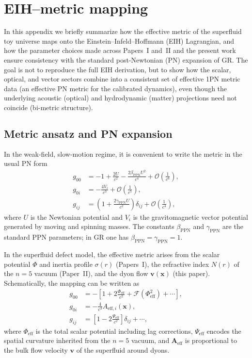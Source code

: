 \documentclass[11pt]{article}
\begin{document}
\section{EIH--metric mapping}
\label{app:eih-metric}

In this appendix we briefly summarize how the effective metric of the
superfluid toy universe maps onto the Einstein--Infeld--Hoffmann
(EIH) Lagrangian, and how the parameter choices made across
Papers~I and~II and the present work ensure consistency with the standard post-Newtonian
(PN) expansion of GR.
The goal is not to reproduce the full EIH derivation, but to show how
the scalar, optical, and vector sectors combine into a consistent set of
effective 1PN metric data (an effective PN metric for the calibrated dynamics),
even though the underlying acoustic (optical) and hydrodynamic (matter)
projections need not coincide (bi-metric structure).

\subsection{Metric ansatz and PN expansion}

In the weak-field, slow-motion regime, it is convenient to write the
metric in the usual PN form
\begin{align}
g_{00}
  &= -1 + \frac{2U}{c^2} - \frac{2\beta_{\mathrm{PPN}} U^2}{c^4}
     + \mathcal{O}\!\left(\frac{1}{c^6}\right),
  \label{eq:app-g00-PN}\\
  g_{0i}
  &= -\frac{4V_i}{c^3}
     + \mathcal{O}\!\left(\frac{1}{c^5}\right),
  \label{eq:app-g0i-PN}\\
g_{ij}
  &= \left(1 + \frac{2\gamma_{\mathrm{PPN}} U}{c^2}\right)\delta_{ij}
     + \mathcal{O}\!\left(\frac{1}{c^4}\right),
  \label{eq:app-gij-PN}
\end{align}
where $U$ is the Newtonian potential and $V_i$ is the gravitomagnetic
vector potential generated by moving and spinning masses.
The constants $\beta_{\mathrm{PPN}}$ and $\gamma_{\mathrm{PPN}}$ are
the standard PPN parameters;
in GR one has $\beta_{\mathrm{PPN}}=\gamma_{\mathrm{PPN}}=1$.

In the superfluid defect model, the effective metric arises from the
scalar potential $\Phi$ and inertia profile $\sigma(r)$ (Papers~I),
the refractive index $N(r)$ of the $n=5$ vacuum (Paper~II), and the
dyon flow $\mathbf{v}(\mathbf{x})$ (this paper).
Schematically, the mapping can be written as
\begin{align}
  g_{00}
  &= -\left[ 1 + 2\frac{\Phi_{\text{eff}}}{c^2}
              + \mathcal{F}(\Phi_{\text{eff}}^2)
              + \cdots
      \right],
  \\
  g_{0i}
  &= -\frac{4}{c^3} A_{\text{eff},i}(\mathbf{x}),
  \\
  g_{ij}
  &= \left[1 - 2\frac{\Psi_{\text{eff}}}{c^2}\right]\delta_{ij}
     + \cdots,
\end{align}
where $\Phi_{\text{eff}}$ is the total scalar potential including
lag corrections, $\Psi_{\text{eff}}$ encodes the spatial curvature
inherited from the $n=5$ vacuum, and $\mathbf{A}_{\text{eff}}$ is
proportional to the bulk flow velocity $\mathbf{v}$ of the superfluid
around dyons.
\end{document}
